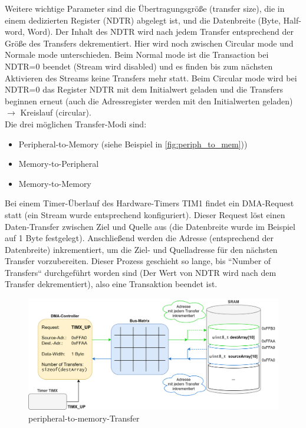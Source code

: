\documentclass[a4paper, portrait, 12pt]{scrartcl} %
\begin{document}
Weitere wichtige Parameter sind die Übertragungsgröße (transfer size), die in einem dedizierten Register (NDTR) abgelegt ist, und die Datenbreite (Byte, Half-word, Word). Der Inhalt des NDTR wird nach jedem Transfer entsprechend der Größe des Transfers dekrementiert. Hier wird noch zwischen Circular mode und Normale mode unterschieden. Beim Normal mode ist die Transaction bei NDTR=0 beendet (Stream wird disabled) und es finden bis zum nächsten Aktivieren des Streams keine Transfers mehr statt. Beim Circular mode wird bei NDTR=0 das Register NDTR mit dem Initialwert geladen und die Transfers beginnen erneut (auch die Adressregister werden mit den Initialwerten geladen) $\rightarrow$ Kreislauf (circular).\\

Die drei möglichen Transfer-Modi sind:
\begin{itemize}
	\item Peripheral-to-Memory (siehe Beispiel in \autoref{fig:periph_to_mem}))
	\item Memory-to-Peripheral
	\item Memory-to-Memory
\end{itemize}

Bei einem Timer-Überlauf des Hardware-Timers TIM1 findet ein DMA-Request statt (ein Stream wurde entsprechend konfiguriert). Dieser Request löst einen Daten-Transfer zwischen Ziel und Quelle aus (die Datenbreite wurde im Beispiel auf 1 Byte festgelegt). Anschließend werden die Adresse (entsprechend der Datenbreite) inkrementiert, um die Ziel- und Quelladresse für den nächsten Transfer vorzubereiten. Dieser Prozess geschieht so lange, bis ``Number of Transfers`` durchgeführt worden sind (Der Wert von NDTR wird nach dem Transfer dekrementiert), also eine Transaktion beendet ist.\\

\begin{figure}[H]
	\centering
    \includegraphics[scale=0.1]{Prinzip_periph2mem.png} 
	\caption{peripheral-to-memory-Transfer}
	\label{fig:periph_to_mem}
\end{figure}
\end{document}
